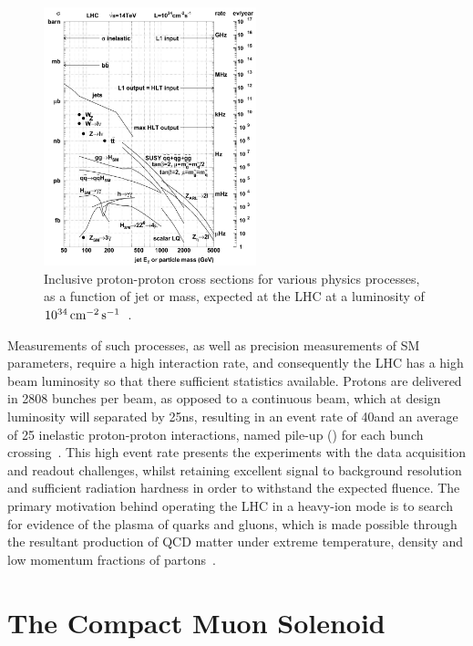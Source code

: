 \begin{figure}[htbp]
\begin{center}
\includegraphics[width=0.55\textwidth]{figs/cms/crossSections.pdf}
\caption{Inclusive proton-proton cross sections for various physics processes, as a function of jet \ET or mass, expected at the LHC at a luminosity of $10^{34}\,\text{cm}^\text{$-$2}\,\text{s}^\text{$-$1}$~\cite{Dasu:2000ge}.}
\label{fig:crossSections}
\end{center}
\end{figure}

Measurements of such processes, as well as precision measurements of SM parameters, require a high interaction rate, and consequently the LHC has a high beam luminosity so that there sufficient statistics available.
Protons are delivered in 2808 bunches per beam, as opposed to a continuous beam, which at design luminosity will separated by 25ns, resulting in an event rate of 40\MHz and an average of 25 inelastic proton-proton interactions, named pile-up (\PU) for each bunch crossing~\cite{Bruning:782076,Ball:2007zza}. 
This high event rate presents the experiments with the data acquisition and readout challenges, whilst retaining excellent signal to background resolution and sufficient radiation hardness in order to withstand the expected fluence.
The primary motivation behind operating the LHC in a heavy-ion mode is to search for evidence of the plasma of quarks and gluons, which is made possible through the resultant production of QCD matter under extreme temperature, density and low momentum fractions of partons~\cite{Baur:687318}.

\section{The Compact Muon Solenoid}\label{sec:cms}
